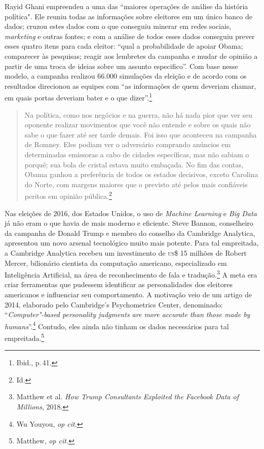 Rayid Ghani empreendeu a uma das ``maiores operações de análise da
história política". Ele reuniu todas as informações sobre eleitores em
um único banco de dados; cruzou estes dados com o que conseguiu minerar
em redes sociais, \emph{marketing} e outras fontes; e com a análise de todos
esses dados conseguiu prever esses quatro itens para cada eleitor:
``qual a probabilidade de apoiar Obama; comparecer às pesquisas; reagir
aos lembretes da campanha e mudar de opinião a partir de uma troca de
ideias sobre um assunto especifico''. Com base nesse modelo, a campanha
realizou 66.000 simulações da eleição e de acordo com os resultados
direcionou as equipes com ``as informações de quem deveriam chamar, em
quais portas deveriam bater e o que dizer''.\footnote{Ibid., p.\,41.}

\begin{quote}
Na política, como nos negócios e na guerra, não há nada pior que ver seu
oponente realizar movimentos que você não entende e sobre os quais não
sabe o que fazer até ser tarde demais. Foi isso que aconteceu na
campanha de Romney. Eles podiam ver o adversário comprando anúncios em
determinadas emissoras a cabo de cidades específicas, mas não sabiam o
porquê; sua bola de cristal estava muito embaçada. No fim das contas,
Obama ganhou a preferência de todos os estados decisivos, exceto
Carolina do Norte, com margens maiores que o previsto até pelos mais
confiáveis peritos em opinião pública.\footnote{Id.}
\end{quote}

Nas eleições de 2016, dos Estados Unidos, o uso de \emph{Machine
Learning} e \emph{Big Data} já não eram o que havia de mais moderno e
eficiente. Steve Bannon, conselheiro da campanha de Donald Trump e
membro do conselho da Cambridge Analytica, apresentou um novo arsenal
tecnológico muito mais potente. Para tal empreitada, a Cambridge
Analytica recebeu um investimento de \textsc{us}\$ 15 milhões de Robert Mercer,
bilionário cientista da computação americano, especializado em
Inteligência Artificial, na área de reconhecimento de fala e tradução.\footnote{Matthew et al. \emph{How Trump Consultants Exploited the
Facebook Data of Millions}, 2018.} A meta era criar ferramentas que pudessem identificar as personalidades dos eleitores
americanos e influenciar seu comportamento. A motivação veio de um
artigo de 2014, elaborado pelo Cambridge's Psychometrics Center,
denominado: ``\emph{Computer"-based personality judgments are more
accurate than those made by humans}''.\footnote{Wu Youyou, \emph{op cit.}} Contudo, eles
ainda não tinham os dados necessários para tal empreitada.\footnote{Matthew, \emph{op cit.}}

